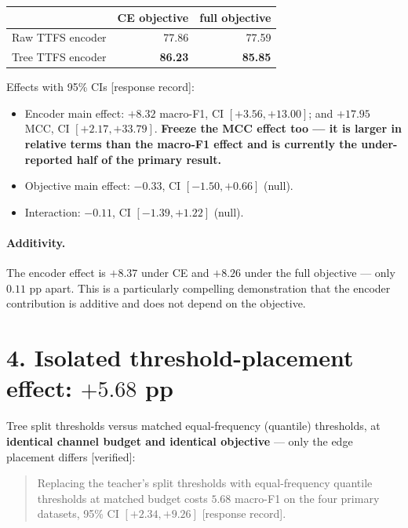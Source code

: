 \begin{center}\small
\begin{tabular}{lrr}\toprule
 & CE objective & full objective \\\midrule
Raw TTFS encoder  & 77.86 & 77.59 \\
Tree TTFS encoder & \textbf{86.23} & \textbf{85.85} \\
\bottomrule\end{tabular}\end{center}

\noindent Effects with 95\% CIs \textup{[response record]}:
\begin{itemize}
  \item Encoder main effect: $\mathbf{+8.32}$ macro-F1, CI $[+3.56, +13.00]$; and
        $\mathbf{+17.95}$ MCC, CI $[+2.17, +33.79]$. \textbf{Freeze the MCC effect too ---
        it is larger in relative terms than the macro-F1 effect and is currently the
        under-reported half of the primary result.}
  \item Objective main effect: $-0.33$, CI $[-1.50, +0.66]$ (null).
  \item Interaction: $-0.11$, CI $[-1.39, +1.22]$ (null).
\end{itemize}

\paragraph{Additivity.} The encoder effect is $+8.37$ under CE and $+8.26$ under the full
objective --- only $\mathbf{0.11}$ pp apart. This is a particularly compelling
demonstration that the encoder contribution is additive and does not depend on the
objective.

\section*{4. Isolated threshold-placement effect: $+5.68$ pp}

Tree split thresholds versus matched equal-frequency (quantile) thresholds, at
\textbf{identical channel budget and identical objective} --- only the edge placement
differs \textup{[verified]}:

\begin{quote}
Replacing the teacher's split thresholds with equal-frequency quantile thresholds at
matched budget costs $\mathbf{5.68}$ macro-F1 on the four primary datasets, 95\% CI
$[+2.34, +9.26]$ \textup{[response record]}.
\end{quote}

